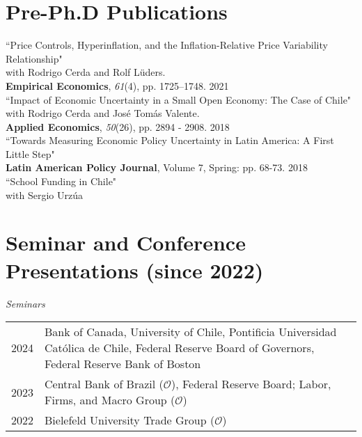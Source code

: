 \documentclass[10pt]{article}
\begin{document}
\section*{Pre-Ph.D Publications}
``Price Controls, Hyperinflation, and the Inflation-Relative Price Variability Relationship"\\
\indent with Rodrigo Cerda and Rolf L\"{u}ders. \\
\indent \textbf{Empirical Economics}, \emph{61}(4), pp. 1725--1748. 2021\\[-0.125in]

\noindent ``Impact of Economic Uncertainty in a Small Open Economy: The Case of Chile"\\
\indent with Rodrigo Cerda and Jos\'e Tom\'as Valente. \\
\indent \textbf{Applied Economics}, \textit{50}(26), pp. 2894 - 2908. 2018\\[-0.125in]



\noindent ``Towards Measuring Economic Policy Uncertainty in Latin America: A First Little Step" \\
\indent \textbf{Latin American Policy Journal}, Volume 7, Spring: pp. 68-73. 2018\\[-0.125in]

\noindent ``School Funding in Chile"\\
\indent with Sergio Urz\'ua \\

\section*{Seminar and Conference Presentations (since 2022)}

\noindent 
\emph{Seminars}\\[0.1in]
\begin{small}
\begin{tabular}{@{}lp{15.5cm}}
2024& Bank of Canada, University of Chile, Pontificia Universidad Cat\'olica de Chile, Federal Reserve Board of Governors, Federal Reserve Bank of Boston\\
2023& Central Bank of Brazil ($\mathcal{O}$), Federal Reserve Board; Labor, Firms, and Macro Group ($\mathcal{O}$)\\
2022& Bielefeld University Trade Group ($\mathcal{O}$)%
\end{tabular}
\end{small}
\end{document}

